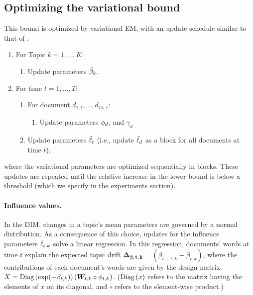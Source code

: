 \subsection*{Optimizing the variational bound}
This bound is optimized by variational EM, with an update schedule similar to that of \cite{blei:2006}:
\begin{enumerate}
\item For Topic $k=1, \ldots, K$:
  \begin{enumerate}
  \item Update parameters $\tilde{\beta}_k$.
  \end{enumerate}
\item For time $t = 1, \ldots, T$:
  \begin{enumerate}
  \item For document $d_{1,t}, \ldots, d_{{D_t}, t}$:
    \begin{enumerate}
    \item Update parameters $\phi_d$, and $\gamma_d$
      \end{enumerate}
    \item Update parameters $\tilde{\ell}_t$ (i.e., update $\tilde{\ell}_d$ as a
      block for all documents at time $t$),
    \end{enumerate}
  \end{enumerate}    
where the variational parameters are optimized sequentially in
blocks.  These updates are repeated until the relative increase in
the lower bound is below a threshold (which we specify in the
experiments section).

\paragraph{Influence values.}
In the DIM, changes in a topic's mean parameters are governed by a
normal distribution.  As a consequence of this choice, updates for the
influence parameters $\tilde{\ell}_{t,k}$ solve a linear regression.  In this
regression, documents' words at time $t$ explain the expected topic
drift $\bm{\Delta_{\beta,t,k}} = (\beta_{t+1,k} - \beta_{t,k})$, where
the contributions of each document's words are given by the design
matrix $X = \mbox{Diag}\left( \exp(-\beta_{t,k}) \right) (\bm W_{t,k} \circ \phi_{t,k}
)$. ($\mbox{Diag}\left( x \right)$ refers to the matrix having the elements of
$x$ on its diagonal, and $\circ$ refers to the element-wise product.)

